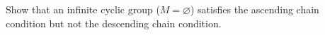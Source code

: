 Show that an infinite cyclic group ($M = \varnothing$) satisfies the ascending chain condition but not the descending chain condition.
